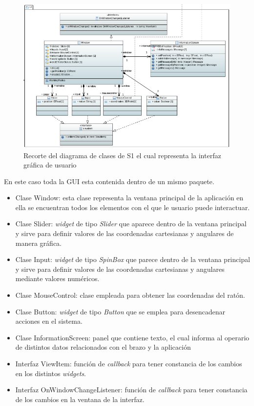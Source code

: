 \begin{figure}[H]
    \centering
    \includegraphics[width=\linewidth]{pictures/S1ClassDiagramGUI.PNG}
    \caption{Recorte del diagrama de clases de \ac{S1} el cual representa la interfaz gráfica de usuario}
    \label{fig:diagrama_clases_GUI_s1}
\end{figure}

En este caso toda la GUI esta contenida dentro de un mismo paquete.

\begin{itemize}
    \item Clase Window: esta clase representa la ventana principal de la aplicación en ella se encuentran todos los elementos con el que le usuario puede interactuar.
    \item Clase Slider: \textit{widget} de tipo \textit{Slider} que aparece dentro de la ventana principal y sirve para definir valores de las coordenadas cartesianas y angulares de manera gráfica.
    \item Clase Input: \textit{widget} de tipo \textit{SpinBox} que parece dentro de la ventana principal y sirve para definir valores de las coordenadas cartesianas y angulares mediante valores numéricos.
    \item Clase MouseControl: clase empleada para obtener las coordenadas del ratón.
    \item Clase Button: \textit{widget} de tipo \textit{Button} que se emplea para desencadenar acciones en el sistema.
    \item Clase InformationScreen: panel que contiene texto, el cual informa al operario de distintos datos relacionados con el brazo y la aplicación
    \item Interfaz ViewItem: función de \textit{callback} para tener constancia de los cambios en los distintos \textit{widgets}.
    \item Interfaz OnWindowChangeListener: función de \textit{callback} para tener constancia de los cambios en la ventana de la interfaz.
\end{itemize}


